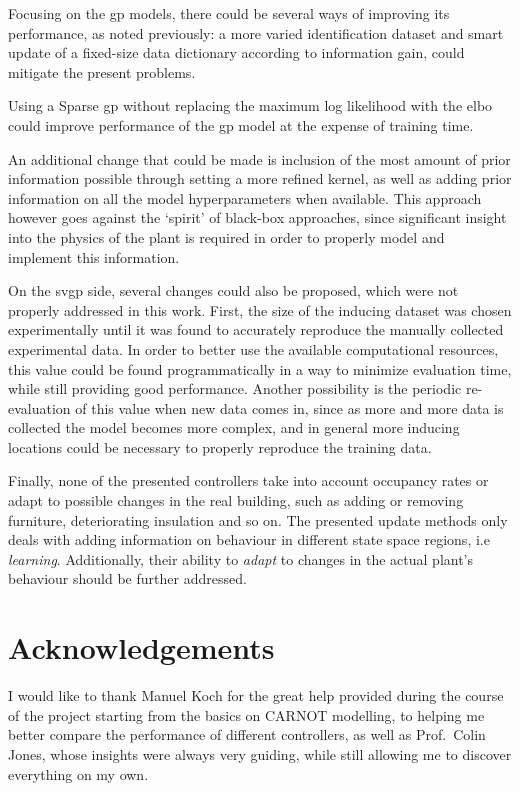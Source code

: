 Focusing on the \acrlong{gp} models, there could be several ways of improving
its performance, as noted previously: a more varied identification dataset and
smart update of a fixed-size data dictionary according to information gain,
could mitigate the present problems.

Using a Sparse \acrshort{gp} without replacing the maximum log likelihood
with the \acrshort{elbo} could improve performance of the \acrshort{gp} model at
the expense of training time.

An additional change that could be made is inclusion of the most amount of prior
information possible through setting a more refined kernel, as well as adding
prior information on all the model hyperparameters when available. This approach
however goes against the `spirit' of black-box approaches, since significant
insight into the physics of the plant is required in order to properly model and
implement this information.

On the \acrshort{svgp} side, several changes could also be proposed, which were
not properly addressed in this work. First, the size of the inducing dataset was
chosen experimentally until it was found to accurately reproduce the manually
collected experimental data. In order to better use the available computational
resources, this value could be found programmatically in a way to minimize
evaluation time, while still providing good performance. Another possibility is
the periodic re-evaluation of this value when new data comes in, since as more
and more data is collected the model becomes more complex, and in general more
inducing locations could be necessary to properly reproduce the training data.

Finally, none of the presented controllers take into account occupancy rates or
adapt to possible changes in the real building, such as adding or removing
furniture, deteriorating insulation and so on. The presented update methods only
deals with adding information on behaviour in different state space regions, i.e
\textit{learning}. Additionally, their ability to \textit{adapt} to changes in
the actual plant's behaviour should be further addressed.

\section*{Acknowledgements}

I would like to thank Manuel Koch for the great help provided during the course
of the project starting from the basics on CARNOT modelling, to helping me
better compare the performance of different controllers, as well as Prof.\ Colin
Jones, whose insights were always very guiding, while still allowing me to
discover everything on my own.

\clearpage
